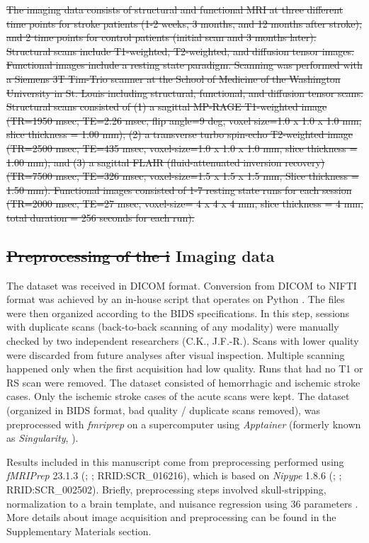 \documentclass[fleqn,10pt]{wlscirep}
\begin{document}
\color{red} \st{The imaging data consists of structural and functional MRI at three different time points for stroke patients (1-2 weeks, 3 months, and 12 months after stroke), and 2 time points for control patients (initial scan and 3 months later). Structural scans include T1-weighted, T2-weighted, and diffusion tensor images. Functional images include a resting state paradigm. Scanning was performed with a Siemens 3T Tim-Trio scanner at the School of Medicine of the Washington University in St. Louis including structural, functional, and diffusion tensor scans. Structural scans consisted of (1) a sagittal MP-RAGE T1-weighted image (TR=1950 msec, TE=2.26 msec, flip angle=9 deg, voxel size=1.0 x 1.0 x 1.0 mm, slice thickness = 1.00 mm); (2) a transverse turbo spin-echo T2-weighted image (TR=2500 msec, TE=435 msec, voxel-size=1.0 x 1.0 x 1.0 mm, slice thickness = 1.00 mm); and (3) a sagittal FLAIR (fluid-attenuated inversion recovery) (TR=7500 msec, TE=326 msec, voxel-size=1.5 x 1.5 x 1.5 mm, Slice thickness = 1.50 mm). Functional images consisted of 1-7 resting state runs for each session (TR=2000 msec, TE=27 msec, voxel-size= 4 x 4 x 4 mm, slice thickness = 4 mm, total duration = 256 seconds for each run).} \color{black} 

\subsection*{\color{red}\st{Preprocessing of the i} \color{blue} Imaging data \color{black}}
The dataset was received in DICOM format. Conversion from DICOM to NIFTI format was achieved by an in-house script that operates on Python \citep{rogetgithub}. The files were then organized according to the BIDS specifications. In this step, sessions with duplicate scans (back-to-back scanning of any modality) were manually checked by two independent researchers (C.K., J.F.-R.). Scans with lower quality were discarded from future analyses after visual inspection. Multiple scanning happened only when the first acquisition had low quality. Runs that had no T1 or RS scan were removed. The dataset consisted of hemorrhagic and ischemic stroke cases. Only the ischemic stroke cases of the acute scans were kept. The dataset (organized in BIDS format, bad quality / duplicate scans removed), was preprocessed with \emph{fmriprep} \citep{fmriprep1} on a supercomputer using \emph{Apptainer} (formerly known as \emph{Singularity}, \cite{kurtzer2017singularity}).

Results included in this manuscript come from preprocessing performed using \emph{fMRIPrep} 23.1.3 (\citet{fmriprep1}; \citet{fmriprep2}; RRID:SCR\_016216), which is based on \emph{Nipype} 1.8.6
(\citet{nipype1}; \citet{nipype2}; RRID:SCR\_002502). \color{blue} Briefly, preprocessing steps involved skull-stripping, normalization to a brain template, and nuisance regression using 36 parameters \citep{satterthwaite_2013}. More details about image acquisition and preprocessing can be found in the Supplementary Materials section. \color{black}
\end{document}
